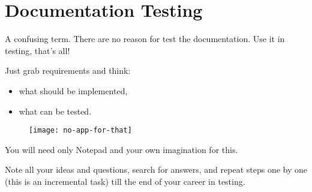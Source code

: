 \section{Documentation Testing}
\label{sec:Documentation Testing}

A confusing term. There are no reason for test the documentation. Use it in testing, that's all!

Just grab requirements and think:
\begin{itemize}
 \item what should be implemented,
 \item what can be tested.
\end{itemize}

\begin{figure}[!h]
\centering
\texttt{[image: no-app-for-that]}
\caption{}
\label{fig:no-app-for-that}
\end{figure}

You will need only  Notepad and your own imagination for this.

Note all your ideas and questions, search for answers, and repeat steps one by one (this is an incremental task) till the end of your career in testing.
